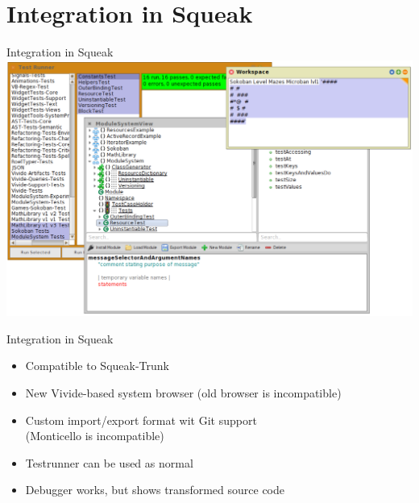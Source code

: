 \documentclass[xcolor=dvipsname, handout]{beamer} %
\newenvironment{explainframe}[1]{
\setboolean{isexplainframe}{true}
\addtocounter{framenumber}{-1}
\setbeamertemplate{background}[grid][step=5mm,color=LightGray]
\begin{frame}[fragile,environment=explainframe]{Handout only: #1}%
}{%
\end{frame}%
\setboolean{isexplainframe}{false}
}
\newenvironment{clearexplainframe}[0]{
\setboolean{isexplainframe}{true}
\addtocounter{framenumber}{-1}
\setbeamertemplate{background}[grid][step=5mm,color=LightGray]
\begin{frame}[fragile,environment=clearexplainframe]%
}{%
\end{frame}%
\setboolean{isexplainframe}{false}
}
\begin{document}



\section{Integration in Squeak}
\begin{frame}{Integration in Squeak}
  \centering
  \includegraphics[width=\textwidth]{screenshot_integration.png}
\end{frame}

\begin{frame}{Integration in Squeak}
\begin{itemize}
  \item Compatible to Squeak-Trunk
  \item New Vivide-based system browser (old browser is incompatible)
  \item Custom import/export format wit Git support \\ (Monticello is incompatible)
  \item Testrunner can be used as normal
  \item Debugger works, but shows transformed source code
\end{itemize}
\end{frame}
\end{document}
